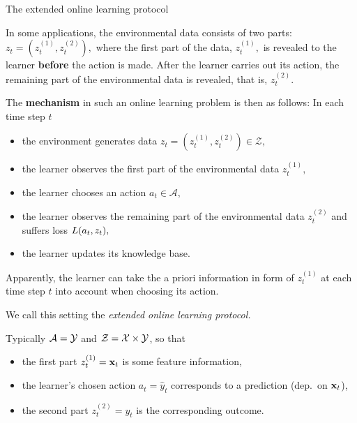 \documentclass[11pt,compress,t,notes=noshow, xcolor=table]{beamer}
\begin{document}
\begin{frame}{The extended online learning protocol}
\footnotesize
\begin{itemize}
	 \item In some applications, the environmental data consists of two parts: $z_{t} = (z_{t}^{(1)}, z_{t}^{(2)}),$ where the first part of the data, $z_{t}^{(1)},$ is revealed to the learner \textbf{before} the action is made.
	After the learner carries out its action, the remaining part of the environmental data is revealed, that is, $z_{t}^{(2)}.$
	{ {  \item The \textbf{mechanism} in such an online learning problem is then as follows: In each time step $t$
	\begin{itemize}\footnotesize
		 \item the environment generates data $z_{t} = (z_{t}^{(1)}, z_{t}^{(2)}) \in \mathcal{Z},$
		 \item the learner observes the first part of the environmental data $ z_{t}^{(1)},$
		 \item the learner chooses an action $a_{t} \in \mathcal{A},$  
		 \item the learner observes the remaining part of the environmental data $z_{t}^{(2)}$ and suffers loss $L(a_{t},z_{t}),$ 
		 \item the learner updates its knowledge base.
	\end{itemize} }}
	{ {  \item Apparently, the learner can  take the a priori information in form of $ z_{t}^{(1)}$ at each time step $t$ into account when choosing its action. }}
	{ {  \item We call this setting the \emph{extended online learning protocol.}	}}
%	 
	 { { \item 	Typically $\mathcal{A} = \mathcal{Y}$ and  $ \mathcal{Z} = \mathcal{X} \times \mathcal{Y}$, so that
	 		\begin{itemize}\footnotesize
	 			\item the first part $z_{t}^{(1)} = \mathbf{x}_t$ is some feature information,
	 			\item the learner's chosen action $a_{t} = \hat{y}_t$ corresponds to a prediction (dep.\ on $\mathbf{x}_t$),
%	 			
				\item the second part $z_{t}^{(2)} =y_t$ is the corresponding outcome.
%	 			
	 \end{itemize}}}	
\end{itemize}
%
\end{frame}
\end{document}
